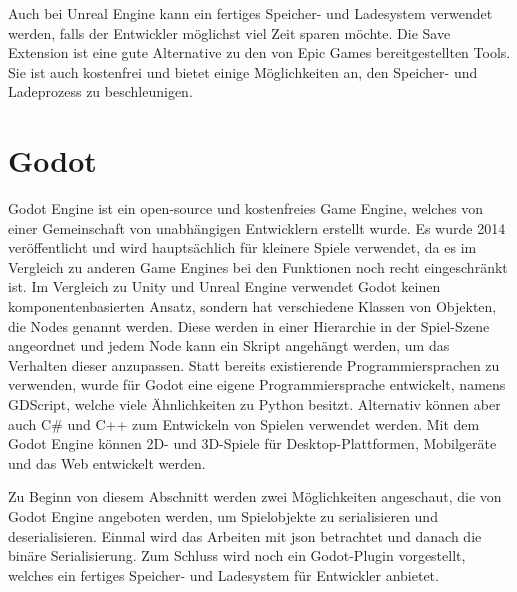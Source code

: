 Auch bei Unreal Engine kann ein fertiges Speicher- und Ladesystem verwendet werden, falls der Entwickler möglichst viel Zeit sparen möchte. Die Save Extension ist eine gute Alternative zu den von Epic Games bereitgestellten Tools. Sie ist auch kostenfrei und bietet einige Möglichkeiten an, den Speicher- und Ladeprozess zu beschleunigen. 



\section{Godot}
Godot Engine ist ein open-source und kostenfreies Game Engine, welches von einer Gemeinschaft von unabhängigen Entwicklern erstellt wurde. Es wurde 2014 veröffentlicht und wird hauptsächlich für kleinere Spiele verwendet, da es im Vergleich zu anderen Game Engines bei den Funktionen noch recht eingeschränkt ist. Im Vergleich zu Unity und Unreal Engine verwendet Godot keinen komponentenbasierten Ansatz, sondern hat verschiedene Klassen von Objekten, die Nodes genannt werden. Diese werden in einer Hierarchie in der Spiel-Szene angeordnet und jedem Node kann ein Skript angehängt werden, um das Verhalten dieser anzupassen. Statt bereits existierende Programmiersprachen zu verwenden, wurde für Godot eine eigene Programmiersprache entwickelt, namens GDScript, welche viele Ähnlichkeiten zu Python besitzt. Alternativ können aber auch C\# und C++ zum Entwickeln von Spielen verwendet werden. Mit dem Godot Engine können 2D- und 3D-Spiele für Desktop-Plattformen, Mobilgeräte und das Web entwickelt werden.\cite{salmela2022game}

Zu Beginn von diesem Abschnitt werden zwei Möglichkeiten angeschaut, die von Godot Engine angeboten werden, um Spielobjekte zu serialisieren und deserialisieren. Einmal wird das Arbeiten mit \ac{json} betrachtet und danach die binäre Serialisierung. Zum Schluss wird noch ein Godot-Plugin vorgestellt, welches ein fertiges Speicher- und Ladesystem für Entwickler anbietet. 



